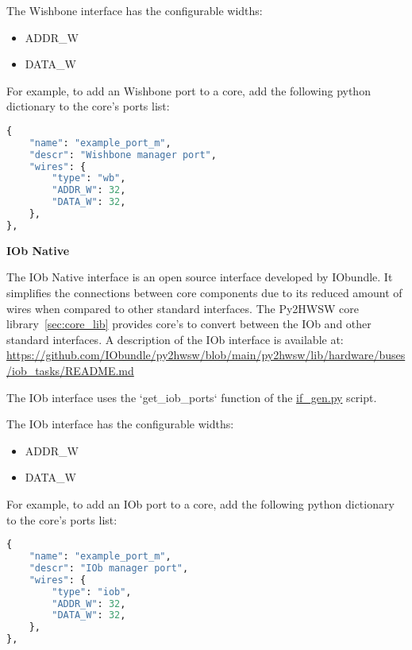 
The Wishbone interface has the configurable widths:
\begin{itemize}
  \item ADDR\_W
  \item DATA\_W
\end{itemize}

For example, to add an Wishbone port to a core, add the following python dictionary to the core's ports list:
\begin{lstlisting}[language=python]
{
	"name": "example_port_m",
	"descr": "Wishbone manager port",
	"wires": {
		"type": "wb",
		"ADDR_W": 32,
		"DATA_W": 32,
	},
},
\end{lstlisting}


%
%
\clearpage
\large\textbf{IOb Native}

The IOb Native interface is an open source interface developed by IObundle.
It simplifies the connections between core components due to its reduced amount of wires when compared to other standard interfaces.
The Py2HWSW core library~\ref{sec:core_lib} provides core's to convert between the IOb and other standard interfaces.
A description of the IOb interface is available at:
\url{https://github.com/IObundle/py2hwsw/blob/main/py2hwsw/lib/hardware/buses/iob_tasks/README.md}

The IOb interface uses the `get\_iob\_ports` function of the \href{https://github.com/IObundle/py2hwsw/blob/main/py2hwsw/scripts/if_gen.py}{if\_gen.py} script.


The IOb interface has the configurable widths:
\begin{itemize}
  \item ADDR\_W
  \item DATA\_W
\end{itemize}

For example, to add an IOb port to a core, add the following python dictionary to the core's ports list:
\begin{lstlisting}[language=python]
{
	"name": "example_port_m",
	"descr": "IOb manager port",
	"wires": {
		"type": "iob",
		"ADDR_W": 32,
		"DATA_W": 32,
	},
},
\end{lstlisting}


